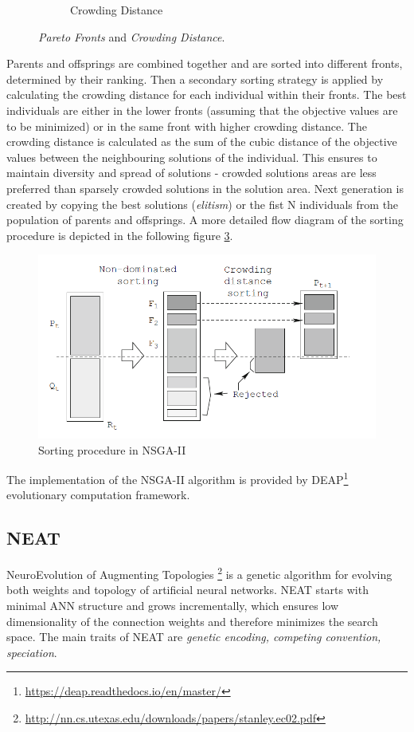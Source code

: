 \documentclass[format=acmsmall, review=false, screen=true]{acmart}
\begin{document}
\begin{figure}[H]
\begin{subfigure}[t]{0.43\textwidth}
    \caption{\label{fig:endings}Crowding Distance}
  \end{subfigure}
  \caption{\textit{Pareto Fronts} and \textit{Crowding Distance}.}
  \label{fig:action-ending-diagram}
\end{figure}


Parents and offsprings are combined together and are sorted into different fronts, determined by their ranking. Then a secondary sorting strategy is applied by calculating the crowding distance for each individual within their fronts. The best individuals are either in the lower fronts (assuming that the objective values are to be minimized) or in the same front with higher crowding distance. The crowding distance is calculated as the sum of the cubic distance of the objective values between the neighbouring solutions of the individual. This ensures to maintain diversity and spread of solutions - crowded solutions areas are less preferred than sparsely crowded solutions in the solution area. Next generation is created by copying the best solutions (\emph{elitism}) or the fist N individuals from the population of parents and offsprings. A more detailed flow diagram of the sorting procedure is depicted in the following figure \ref{fig:nsga}.

\begin{figure}[H]
  \includegraphics[width=0.66\linewidth]{img/nsga.PNG}
  \caption{\label{fig:nsga}Sorting procedure in NSGA-II}
\end{figure}

The implementation of the NSGA-II algorithm is provided by DEAP\footnote{\url{https://deap.readthedocs.io/en/master/}} evolutionary computation framework.

\subsection{NEAT}

NeuroEvolution of Augmenting Topologies \footnote{\url{http://nn.cs.utexas.edu/downloads/papers/stanley.ec02.pdf}} is a genetic algorithm for evolving both weights and topology of artificial neural networks. NEAT starts with minimal ANN structure and grows incrementally, which ensures low dimensionality of the connection weights and therefore minimizes the search space. The main traits of NEAT are \emph{genetic encoding, competing convention, speciation}.
\end{document}
